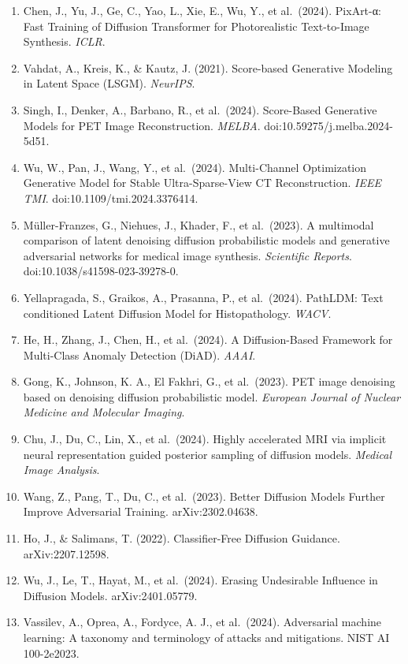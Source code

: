 \begin{enumerate}
\item
  Chen, J., Yu, J., Ge, C., Yao, L., Xie, E., Wu, Y., et al.~(2024). PixArt-α: Fast Training of Diffusion Transformer for Photorealistic Text-to-Image Synthesis. \emph{ICLR}.
\item
  Vahdat, A., Kreis, K., \& Kautz, J. (2021). Score-based Generative Modeling in Latent Space (LSGM). \emph{NeurIPS}.
\item
  Singh, I., Denker, A., Barbano, R., et al.~(2024). Score-Based Generative Models for PET Image Reconstruction. \emph{MELBA}. doi:10.59275/j.melba.2024-5d51.
\item
  Wu, W., Pan, J., Wang, Y., et al.~(2024). Multi-Channel Optimization Generative Model for Stable Ultra-Sparse-View CT Reconstruction. \emph{IEEE TMI}. doi:10.1109/tmi.2024.3376414.
\item
  Müller-Franzes, G., Niehues, J., Khader, F., et al.~(2023). A multimodal comparison of latent denoising diffusion probabilistic models and generative adversarial networks for medical image synthesis. \emph{Scientific Reports}. doi:10.1038/s41598-023-39278-0.
\item
  Yellapragada, S., Graikos, A., Prasanna, P., et al.~(2024). PathLDM: Text conditioned Latent Diffusion Model for Histopathology. \emph{WACV}.
\item
  He, H., Zhang, J., Chen, H., et al.~(2024). A Diffusion-Based Framework for Multi-Class Anomaly Detection (DiAD). \emph{AAAI}.
\item
  Gong, K., Johnson, K. A., El Fakhri, G., et al.~(2023). PET image denoising based on denoising diffusion probabilistic model. \emph{European Journal of Nuclear Medicine and Molecular Imaging}.
\item
  Chu, J., Du, C., Lin, X., et al.~(2024). Highly accelerated MRI via implicit neural representation guided posterior sampling of diffusion models. \emph{Medical Image Analysis}.
\item
  Wang, Z., Pang, T., Du, C., et al.~(2023). Better Diffusion Models Further Improve Adversarial Training. arXiv:2302.04638.
\item
  Ho, J., \& Salimans, T. (2022). Classifier-Free Diffusion Guidance. arXiv:2207.12598.
\item
  Wu, J., Le, T., Hayat, M., et al.~(2024). Erasing Undesirable Influence in Diffusion Models. arXiv:2401.05779.
\item
  Vassilev, A., Oprea, A., Fordyce, A. J., et al.~(2024). Adversarial machine learning: A taxonomy and terminology of attacks and mitigations. NIST AI 100-2e2023.

\end{enumerate}
